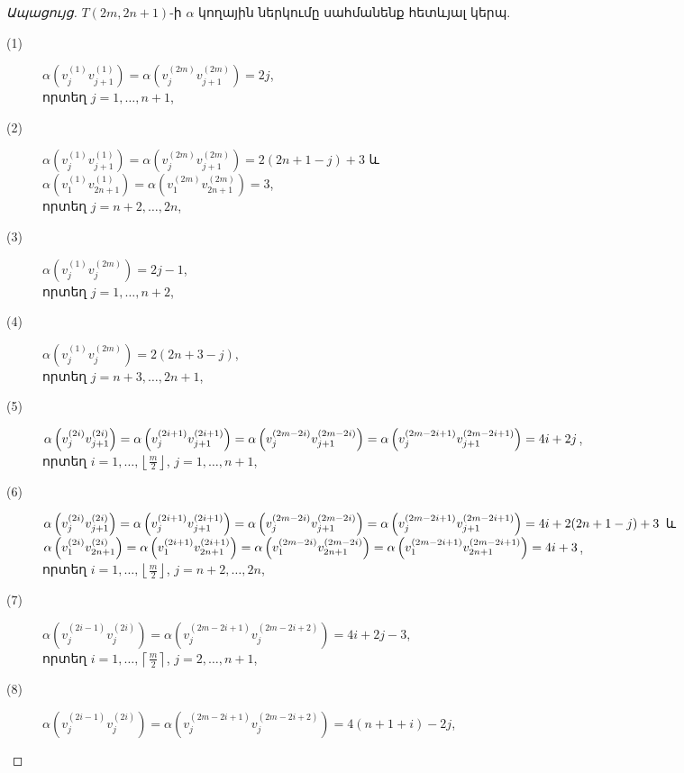 \begin{proof}[Ապացույց]
$T(2m,2n+1)$-ի $\alpha$ կողային ներկումը սահմանենք հետևյալ կերպ.
\begin{description}
\item[(1)] 
$\alpha\left(v_{j}^{(1)}v_{j+1}^{(1)}\right)=\alpha\left(v_{j}^{(2m)}v_{j+1}^{(2m)}\right)=2j$,\\
որտեղ $j=1,\ldots,n+1$,
\item[(2)]
$\alpha\left(v_{j}^{(1)}v_{j+1}^{(1)}\right)=\alpha\left(v_{j}^{(2m)}v_{j+1}^{(2m)}\right)=2(2n+1-j)+3$ և\\
$\alpha\left(v_{1}^{(1)}v_{2n+1}^{(1)}\right)=\alpha\left(v_{1}^{(2m)}v_{2n+1}^{(2m)}\right)=3$, \\
 որտեղ $j=n+2,\ldots,2n$,
\item[(3)] 
$\alpha\left(v_{j}^{(1)}v_{j}^{(2m)}\right)=2j-1$, \\ որտեղ $j=1,\ldots,n+2$,
\item[(4)] 
$\alpha\left(v_{j}^{(1)}v_{j}^{(2m)}\right)=2(2n+3-j)$, \\ որտեղ $j=n+3,\ldots,2n+1$,
\item[(5)] 
$\alpha\left(v_{j}^{(2i)}v_{j+1}^{(2i)}\right)=\alpha\left(v_{j}^{(2i+1)}v_{j+1}^{(2i+1)}\right)=\alpha\left(v_{j}^{(2m-2i)}v_{j+1}^{(2m-2i)}\right)=\\
\alpha\left(v_{j}^{(2m-2i+1)}v_{j+1}^{(2m-2i+1)}\right)=4i+2j$, \\ որտեղ $i=1,\ldots,\left\lfloor\frac{m}{2}\right\rfloor$, $j=1,\ldots,n+1$,
\item[(6)] 
$\alpha\left(v_{j}^{(2i)}v_{j+1}^{(2i)}\right)=\alpha\left(v_{j}^{(2i+1)}v_{j+1}^{(2i+1)}\right)=\alpha\left(v_{j}^{(2m-2i)}v_{j+1}^{(2m-2i)}\right)=\\
\alpha\left(v_{j}^{(2m-2i+1)}v_{j+1}^{(2m-2i+1)}\right)=4i+2(2n+1-j)+3$
և \\
$\alpha\left(v_{1}^{(2i)}v_{2n+1}^{(2i)}\right)=\alpha\left(v_{1}^{(2i+1)}v_{2n+1}^{(2i+1)}\right)=\alpha\left(v_{1}^{(2m-2i)}v_{2n+1}^{(2m-2i)}\right)=\\
\alpha\left(v_{1}^{(2m-2i+1)}v_{2n+1}^{(2m-2i+1)}\right)=4i+3$, 
\\ որտեղ $i=1,\ldots,\left\lfloor\frac{m}{2}\right\rfloor$, $j=n+2,\ldots,2n$,
\item[(7)] 
$\alpha\left(v_{j}^{(2i-1)}v_{j}^{(2i)}\right)=\alpha\left(v_{j}^{(2m-2i+1)}v_{j}^{(2m-2i+2)}\right)=4i+2j-3$,\\
որտեղ $i=1,\ldots,\left\lceil\frac{m}{2}\right\rceil$, $j=2,\ldots,n+1$,
\item[(8)] 
$\alpha\left(v_{j}^{(2i-1)}v_{j}^{(2i)}\right)=\alpha\left(v_{j}^{(2m-2i+1)}v_{j}^{(2m-2i+2)}\right)=4(n+1+i)-2j$,\\ 

\end{description}
\end{proof}

